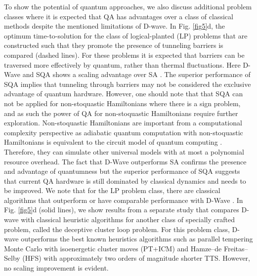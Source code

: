 \documentclass[fleqn,10pt]{wlscirep}
\def\change#1{#1}
\begin{document}
 
To show the potential of quantum approaches, we also discuss additional problem classes where it is expected that QA has advantages over a class of classical methods \cite{albash2018demonstration,denchev2016computational,boixo2016computational} despite the mentioned limitations of D-wave.  In Fig. \ref{fig5}d,  the optimum time-to-solution for the class of logical-planted (LP) problems that are constructed such that they promote the presence of tunneling barriers is compared (dashed lines). For these problems it is expected that barriers can be traversed more effectively by quantum, rather than thermal fluctuations.  Here D-Wave and SQA shows a scaling advantage over SA \cite{albash2018demonstration}. 
 \change{The superior performance of SQA  implies that tunneling through barriers may not be considered the exclusive advantage of quantum hardware. However, one should note that that SQA can not be applied for non-stoquastic Hamiltonians where there is a sign problem, and as such the power of QA for non-stoquastic Hamiltonians require further exploration. Non-stoquastic Hamiltonians are important from a computational complexity perspective as adiabatic quantum computation with non-stoquastic Hamiltonians is equivalent to the circuit model of quantum computing \cite{aharonov2008adiabatic}.  Therefore, they can simulate other universal models with at most a polynomial resource overhead.  The fact that D-Wave outperforms SA confirms the presence and advantage of quantumness but the superior performance of SQA suggests that
current QA hardware is still dominated by classical dynamics and needs to be improved.} \change{We note that for the LP problem class, there are classical algorithms that outperform or have comparable performance with D-Wave \cite{albash2018demonstration}. In Fig. \ref{fig5}d (solid lines), we show results from a separate study \cite{mandra2018deceptive} that compares D-wave with classical heuristic algorithms for another class of specially crafted problem, called the deceptive cluster loop problem. For this problem class, D-wave outperforms the best known heuristics algorithms such as parallel tempering Monte Carlo with isoenergetic cluster moves (PT+ICM) and Hamze–de Freitas–Selby (HFS) with approximately two orders of magnitude shorter TTS. However, no scaling improvement is evident. } %
\end{document}
